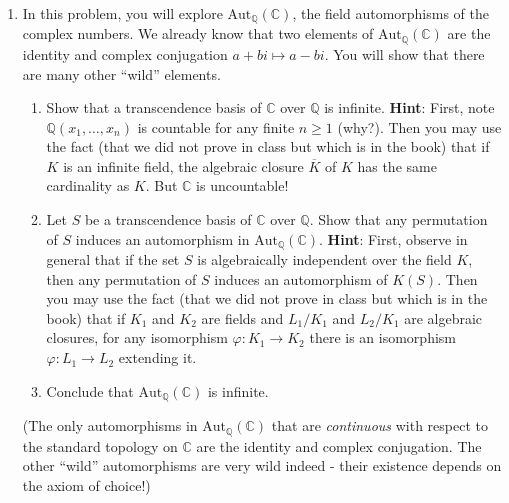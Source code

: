 \documentclass[11pt]{article}
\begin{document}
\begin{enumerate}
\item In this problem, you will explore $\mathrm{Aut}_{\mathbb{Q}}(\mathbb{C})$, the field automorphisms of the complex numbers. We already know that two elements of $\mathrm{Aut}_{\mathbb{Q}}(\mathbb{C})$ are the identity and complex conjugation $a+bi \mapsto a-bi$. You will show that there are many other ``wild'' elements.
\begin{enumerate}
\item Show that a transcendence basis of $\mathbb{C}$ over $\mathbb{Q}$ is infinite. {\bf Hint}: First, note $\mathbb{Q}(x_1,\ldots,x_n)$ is countable for any finite $n \geq 1$ (why?). Then you may use the fact (that we did not prove in class but which is in the book) that if $K$ is an infinite field, the algebraic closure $\overline{K}$ of $K$ has the same cardinality as $K$. But $\mathbb{C}$ is uncountable!
\item Let $S$ be a transcendence basis of $\mathbb{C}$ over $\mathbb{Q}$. Show that any permutation of $S$ induces an automorphism in $\mathrm{Aut}_{\mathbb{Q}}(\mathbb{C})$. {\bf Hint}: First, observe in general that if the set $S$ is algebraically independent over the field $K$, then any permutation of $S$ induces an automorphism of $K(S)$. Then you may use the fact (that we did not prove in class but which is in the book) that if $K_1$ and $K_2$ are fields and $L_1/K_1$ and $L_2/K_1$ are algebraic closures, for any isomorphism $\varphi\colon K_1 \to K_2$ there is an isomorphism $\varphi \colon L_1 \to L_2$ extending it.
\item Conclude that $\mathrm{Aut}_{\mathbb{Q}}(\mathbb{C})$ is infinite.
\end{enumerate}
(The only automorphisms in $\mathrm{Aut}_{\mathbb{Q}}(\mathbb{C})$ that are \emph{continuous} with respect to the standard topology on $\mathbb{C}$ are the identity and complex conjugation. The other ``wild'' automorphisms are very wild indeed - their existence depends on the axiom of choice!)

\end{enumerate}
\end{document}
